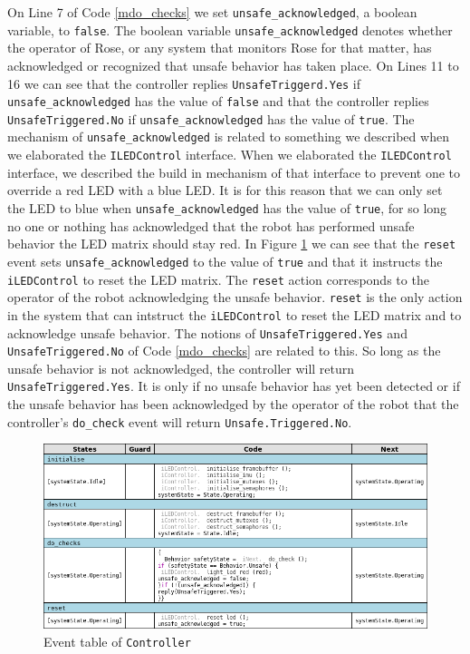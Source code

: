\documentclass[12pt]{scrreprt}
\begin{document}
On Line 7 of Code \ref{mdo_checks} we set \texttt{unsafe\_acknowledged}, a boolean variable, to \texttt{false}. The boolean variable \texttt{unsafe\_acknowledged} denotes whether the operator of Rose, or any system that monitors Rose for that matter, has acknowledged or recognized that unsafe behavior has taken place. On Lines 11 to 16 we can see that the controller replies \texttt{UnsafeTriggerd.Yes} if \texttt{unsafe\_acknowledged} has the value of \texttt{false} and that the controller replies \texttt{UnsafeTriggered.No} if \texttt{unsafe\_acknowledged} has the value of \texttt{true}. The mechanism of \texttt{unsafe\_acknowledged} is related to something we described when we elaborated the \texttt{ILEDControl} interface. When we elaborated the \texttt{ILEDControl} interface, we described the build in mechanism of that interface to prevent one to override a red LED with a blue LED. It is for this reason that we can only set the LED to blue when \texttt{unsafe\_acknowledged} has the value of \texttt{true}, for so long no one or nothing has acknowledged that the robot has performed unsafe behavior the LED matrix should stay red. In Figure \ref{fig:controll_event_table} we can see that the \texttt{reset} event sets \texttt{unsafe\_acknowledged} to the value of \texttt{true} and that it instructs the \texttt{iLEDControl} to reset the LED matrix. The \texttt{reset} action corresponds to the operator of the robot acknowledging the unsafe behavior. \texttt{reset} is the only action in the system that can intstruct the \texttt{iLEDControl} to reset the LED matrix and to acknowledge unsafe behavior. The notions of \texttt{UnsafeTriggered.Yes} and \texttt{UnsafeTriggered.No} of Code \ref{mdo_checks} are related to this. So long as the unsafe behavior is not acknowledged, the controller will return \texttt{UnsafeTriggered.Yes}. It is only if no unsafe behavior has yet been detected or if the unsafe behavior has been acknowledged by the operator of the robot that the controller's \texttt{do\_check} event will return \texttt{Unsafe.Triggered.No}.

 \begin{figure}[H]
     \centering
     \includegraphics[width=\textwidth]{Figures/results/modelling_figures/Controller/Controller_event_table.png}
     \caption{Event table of \texttt{Controller}}
     \label{fig:controll_event_table}
 \end{figure}
 
\end{document}

